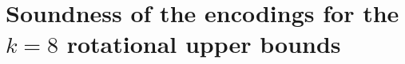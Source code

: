%

\providecommand{\py}[1]{{\upshape\nolinkurl{#1}}}
\providecommand{\sgn}{\operatorname{sgn}}
\providecommand{\dirv}{\operatorname{dir}}

\section{Soundness of the encodings for the \texorpdfstring{$k=8$}{k=8} rotational upper bounds}\label{k8s:sec}

